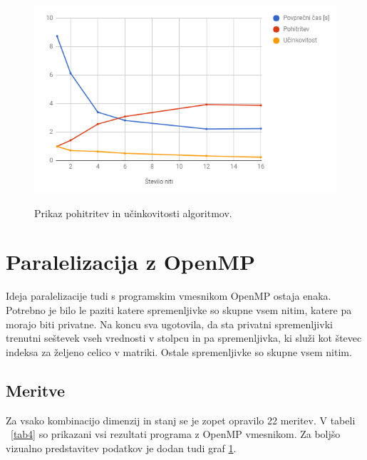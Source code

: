 \documentclass[a4paper,11pt]{article}
\begin{document}
\begin{figure}[H]
\begin{center}
\caption{Prikaz pohitritev in učinkovitosti algoritmov.}
\includegraphics[scale=1]{GrafUcinkovitost.png}
\label{grafOpenMP}
\end{center}
\end{figure}


\section{Paralelizacija z OpenMP}
Ideja paralelizacije tudi s programskim vmesnikom OpenMP ostaja enaka. Potrebno je bilo le paziti katere spremenljivke so skupne vsem nitim, katere pa morajo biti privatne. Na koncu sva ugotovila, da sta privatni spremenljivki trenutni seštevek vseh vrednosti v stolpcu in pa spremenljivka, ki služi kot števec indeksa za željeno celico v matriki. Ostale spremenljivke so skupne vsem nitim.

\subsection{Meritve}
Za vsako kombinacijo dimenzij in stanj se je zopet opravilo 22 meritev. V tabeli ~\ref{tab4} so prikazani vsi rezultati programa z OpenMP vmesnikom. Za boljšo vizualno predstavitev podatkov je dodan tudi graf \ref{grafOpenMP}.
\end{document}
